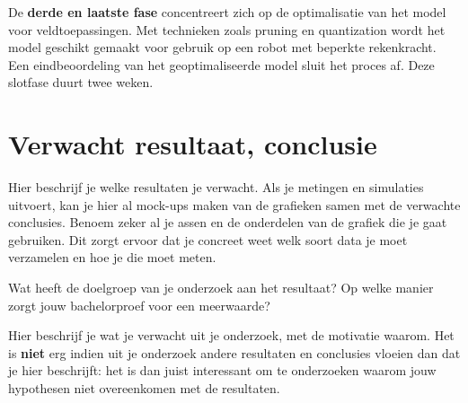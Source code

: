 De \textbf{derde en laatste fase} concentreert zich op de optimalisatie van het model voor veldtoepassingen. Met technieken zoals pruning en quantization wordt het model geschikt gemaakt voor gebruik op een robot met beperkte rekenkracht. Een eindbeoordeling van het geoptimaliseerde model sluit het proces af. Deze slotfase duurt twee weken.

\section{Verwacht resultaat, conclusie}%
\label{sec:verwachte_resultaten}

Hier beschrijf je welke resultaten je verwacht. Als je metingen en simulaties uitvoert, kan je hier al mock-ups maken van de grafieken samen met de verwachte conclusies. Benoem zeker al je assen en de onderdelen van de grafiek die je gaat gebruiken. Dit zorgt ervoor dat je concreet weet welk soort data je moet verzamelen en hoe je die moet meten.

Wat heeft de doelgroep van je onderzoek aan het resultaat? Op welke manier zorgt jouw bachelorproef voor een meerwaarde?

Hier beschrijf je wat je verwacht uit je onderzoek, met de motivatie waarom. Het is \textbf{niet} erg indien uit je onderzoek andere resultaten en conclusies vloeien dan dat je hier beschrijft: het is dan juist interessant om te onderzoeken waarom jouw hypothesen niet overeenkomen met de resultaten.


